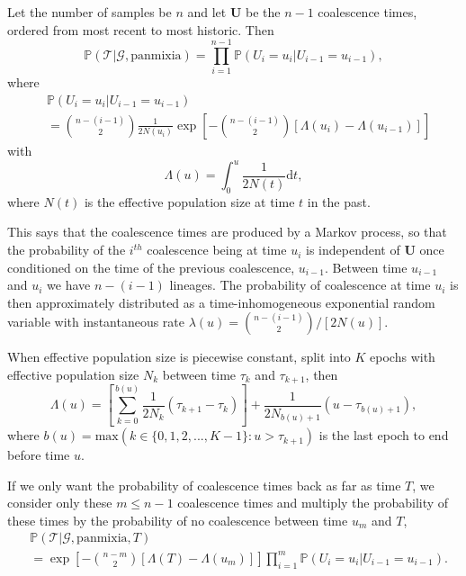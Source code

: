 \documentclass[12pt]{article}
\begin{document}
Let the number of samples be $n$ and let $\mathbf{U}$ be the $n-1$ coalescence times, ordered from most recent to most historic.
Then
%
\begin{equation}
\mathbb{P}(\mathcal{T} | \mathcal{G},\mathrm{panmixia}) = \prod_{i=1}^{n-1} \mathbb{P}(U_i = u_i | U_{i-1} = u_{i-1}),
\end{equation}
%
where
%
\begin{equation}
\begin{aligned}
& \mathbb{P}(U_i = u_i | U_{i-1} = u_{i-1})\\
& = \binom{n-(i-1)}{2}\frac{1}{2N(u_i)}\exp\left[ -\binom{n-(i-1)}{2} [\Lambda(u_i) - \Lambda(u_{i-1})] \right]
\end{aligned}
\end{equation}
%
with
%
\begin{equation}
\Lambda(u) = \int_0^u \frac{1}{2N(t)} \mathrm{d}t,
\end{equation}
%
where $N(t)$ is the effective population size at time $t$ in the past.

This says that the coalescence times are produced by a Markov process, so that the probability of the $i^{th}$ coalescence being at time $u_i$ is independent of $\mathbf{U}$ once conditioned on the time of the previous coalescence, $u_{i-1}$.
Between time $u_{i-1}$ and $u_i$ we have $n-(i-1)$ lineages.
The probability of coalescence at time $u_i$ is then approximately distributed as a time-inhomogeneous exponential random variable with instantaneous rate $\lambda(u) = \binom{n-(i-1)}{2}/[2N(u)]$.

When effective population size is piecewise constant, split into $K$ epochs with effective population size $N_k$ between time $\tau_k$ and $\tau_{k+1}$, then \citep[see Appendix A of][]{stern2020disentangling}
%
\begin{equation}
\Lambda(u) = \left[ \sum_{k=0}^{b(u)} \frac{1}{2N_k} (\tau_{k+1} - \tau_k) \right] + \frac{1}{2N_{b(u)+1}} (u - \tau_{b(u)+1}),
\end{equation}
%
where $b(u) = \mathrm{max}(k \in \{0,1,2,...,K-1\} : u > \tau_{k+1} )$ is the last epoch to end before time $u$.

If we only want the probability of coalescence times back as far as time $T$, we consider only these $m \leq n-1$ coalescence times and multiply the probability of these times by the probability of no coalescence between time $u_m$ and $T$,
%
\begin{equation}
\begin{aligned}
& \mathbb{P}(\mathcal{T} | \mathcal{G},\mathrm{panmixia},T)\\
& = \exp\left[ -\binom{n-m}{2} [\Lambda(T) - \Lambda(u_m)] \right] \prod_{i=1}^{m} \mathbb{P}(U_i = u_i | U_{i-1} = u_{i-1}).
\end{aligned}
\end{equation}
\end{document}
